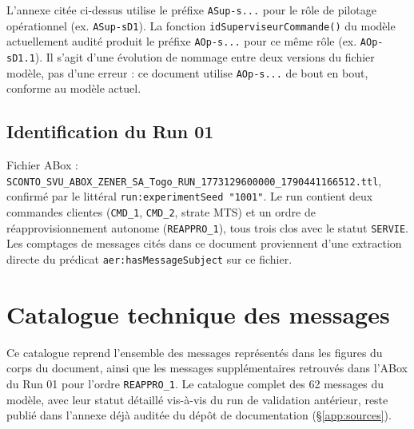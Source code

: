 \documentclass[11pt,a4paper]{article}
\newcommand{\code}[1]{\texttt{#1}}
\begin{document}
L'annexe citée ci-dessus utilise le préfixe \code{ASup-s...} pour le rôle de pilotage opérationnel (ex. \code{ASup-sD1}). La fonction \code{idSuperviseurCommande()} du modèle actuellement audité produit le préfixe \code{AOp-s...} pour ce même rôle (ex. \code{AOp-sD1.1}). Il s'agit d'une évolution de nommage entre deux versions du fichier modèle, pas d'une erreur : ce document utilise \code{AOp-s...} de bout en bout, conforme au modèle actuel.

\subsection{Identification du Run 01}

Fichier ABox : \code{SCONTO\_SVU\_ABOX\_\allowbreak{}ZENER\_SA\_Togo\_\allowbreak{}RUN\_1773129600000\_\allowbreak{}1790441166512.ttl}, confirmé par le littéral \code{run:experimentSeed~"1001"}. Le run contient deux commandes clientes (\code{CMD\_1}, \code{CMD\_2}, strate MTS) et un ordre de réapprovisionnement autonome (\code{REAPPRO\_1}), tous trois clos avec le statut \code{SERVIE}. Les comptages de messages cités dans ce document proviennent d'une extraction directe du prédicat \code{aer:hasMessageSubject} sur ce fichier.

\section{Catalogue technique des messages}
\label{app:catalogue}

Ce catalogue reprend l'ensemble des messages représentés dans les figures du corps du document, ainsi que les messages supplémentaires retrouvés dans l'ABox du Run 01 pour l'ordre \code{REAPPRO\_1}. Le catalogue complet des 62 messages du modèle, avec leur statut détaillé vis-à-vis du run de validation antérieur, reste publié dans l'annexe déjà auditée du dépôt de documentation (\S\ref{app:sources}).
\end{document}
